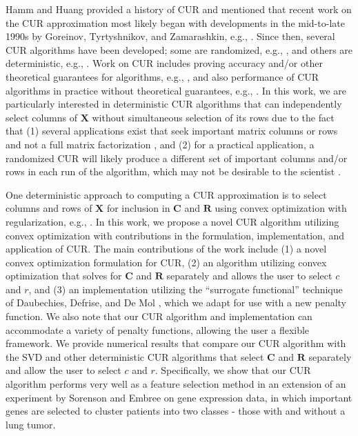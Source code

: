 \documentclass[12pt]{article}
\begin{document}
Hamm and Huang \cite{hamm_huang1_2020} provided a history of CUR and mentioned that recent work on the CUR approximation most likely began with developments in the mid-to-late 1990s by Goreinov, Tyrtyshnikov, and Zamarashkin, e.g., \cite{goreinov_etal_1997}.  Since then, several CUR algorithms have been developed; some are randomized, e.g., \cite{drineas_etal_2006, drineas_etal_2008, mahoney_drineas_2009}, and others are deterministic, e.g., \cite{sorenson_embree_2016, stewart_1999}.  Work on CUR includes proving accuracy and/or other theoretical guarantees for algorithms, e.g., \cite{drineas_etal_2006, mahoney_drineas_2009}, and also performance of CUR algorithms in practice without theoretical guarantees, e.g., \cite{mairal_etal_2011}.  In this work, we are particularly interested in deterministic CUR algorithms that can independently select columns of $\mathbf{X}$ without simultaneous selection of its rows due to the fact that (1) several applications exist that seek important matrix columns or rows and not a full matrix factorization \cite{sorenson_embree_2016}, and (2) for a practical application, a randomized CUR will likely produce a different set of important columns and/or rows in each run of the algorithm, which may not be desirable to the scientist \cite{bien_xu_mahoney_2010, mairal_etal_2011}.  

One deterministic approach to computing a CUR approximation is to select columns and rows of $\mathbf{X}$ for inclusion in $\mathbf{C}$ and $\mathbf{R}$ using convex optimization with regularization, e.g., \cite{bien_xu_mahoney_2010, mairal_etal_2011}.  In this work, we propose a novel CUR algorithm utilizing convex optimization with contributions in the formulation, implementation, and application of CUR. The main contributions of the work include (1) a novel convex optimization formulation for CUR, (2) an algorithm utilizing convex optimization that solves for $\mathbf{C}$ and $\mathbf{R}$ separately and allows the user to select $c$ and $r$, and (3) an implementation utilizing the ``surrogate functional'' technique of Daubechies, Defrise, and De Mol \cite{daubechies_etal_2004}, which we adapt for use with a new penalty function.  We also note that our CUR algorithm and implementation can accommodate a variety of penalty functions, allowing the user a flexible framework.  We provide numerical results that compare our CUR algorithm with the SVD and other deterministic CUR algorithms that select $\mathbf{C}$ and $\mathbf{R}$ separately and allow the user to select $c$ and $r$.  Specifically, we show that our CUR algorithm performs very well as a feature selection method in an extension of an experiment by Sorenson and Embree \cite{sorenson_embree_2016} on gene expression data, in which important genes are selected to cluster patients into two classes - those with and without a lung tumor.
\end{document}
